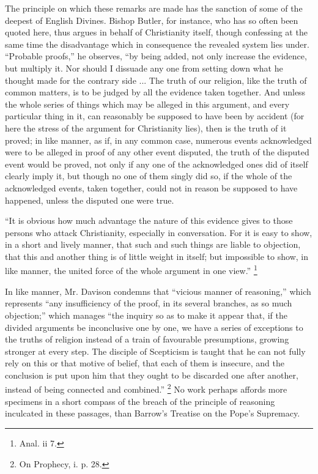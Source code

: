 The principle on which these remarks are made has the
sanction of some of the deepest of English Divines.
Bishop Butler, for instance, who has so often been quoted
here, thus argues in behalf of Christianity itself,
though confessing at the same time the disadvantage which
in consequence the revealed system lies under.
``Probable proofs,'' he observes, ``by being
added, not only increase the evidence, but multiply it.
Nor should I dissuade any one from setting down what he
thought made for the contrary side ... The truth of our
religion, like the truth of common matters, is to be
judged by all the evidence taken together. And unless the
whole series of things which may be alleged in this
argument, and every particular thing in it, can
reasonably be supposed to have been by accident (for here
the stress of the argument for Christianity lies), then
is the truth of it proved; in like manner, as if, in any
common case, numerous events acknowledged were to be
alleged in proof of any other event disputed, the truth
of the disputed event would be proved, not only if any
one of the acknowledged ones did of itself clearly imply
it, but though no one of them singly did so, if the whole
of the acknowledged events, taken together, could not in
reason be supposed to have happened, unless the disputed
one were true.

``It is obvious how much advantage the nature of
this evidence gives to those persons who attack
Christianity, especially in conversation. For it is easy
to show, in a short and lively manner, that such and such
things are liable to objection, that this and another
thing is of little weight in itself; but impossible to
show, in like manner, the united force of the whole
argument in one view.'' \footnote{Anal. ii 7.}

In like manner, Mr. Davison condemns that
``vicious manner of reasoning,'' which represents
``any insufficiency of the proof, in its several
branches, as so much objection;'' which manages
``the inquiry so as to make it appear that, if the
divided arguments be inconclusive one by one, we have a
series of exceptions to the truths of religion instead of
a train of favourable presumptions, growing stronger at
every step. The disciple of Scepticism is taught that he
can not fully rely on this or that motive of belief, that
each of them is insecure, and the conclusion is put upon
him that they ought to be discarded one after another,
instead of being connected and combined.'' \footnote{On Prophecy, i. p. 28.} No work
perhaps affords more specimens in a short compass of the
breach of the principle of reasoning inculcated in these
passages, than Barrow's Treatise on the Pope's Supremacy.

